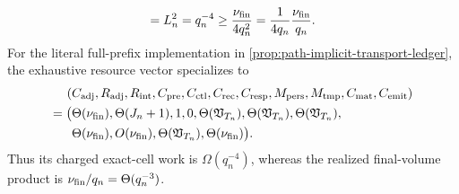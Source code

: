 \begin{proposition}
\begin{equation}
 =L_n^2=q_n^{-4}
 \geq\frac{\nu_{\rm fin}}{4q_n^2}
 =\frac1{4q_n}\frac{\nu_{\rm fin}}{q_n}.
 \label{eq:path-swept-separation}
\end{equation}
For the literal full-prefix implementation in
\cref{prop:path-implicit-transport-ledger}, the exhaustive resource vector
specializes to
\begin{equation}
 \begin{aligned}
 (&C_{\rm adj},R_{\rm adj},R_{\rm int},C_{\rm pre},C_{\rm ctl},C_{\rm rec},
 C_{\rm resp},M_{\rm pers},M_{\rm tmp},C_{\rm mat},C_{\rm emit})\\
 =\bigl(&\Theta(\nu_{\rm fin}),\Theta(J_n+1),1,0,
 \Theta(\mathfrak V_{T_n}),\Theta(\mathfrak V_{T_n}),
 \Theta(\mathfrak V_{T_n}),\\
 &\Theta(\nu_{\rm fin}),O(\nu_{\rm fin}),
 \Theta(\mathfrak V_{T_n}),\Theta(\nu_{\rm fin})\bigr).
 \end{aligned}
 \label{eq:path-swept-eleven-vector}
\end{equation}
Thus its charged exact-cell work is $\Omega(q_n^{-4})$, whereas the realized
final-volume product is
$\nu_{\rm fin}/q_n=\Theta(q_n^{-3})$.
\end{proposition}

